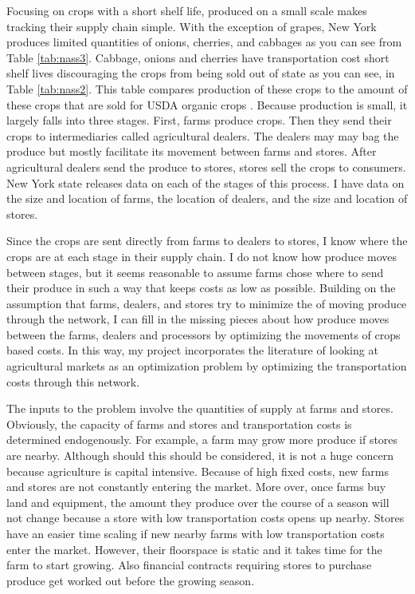 \documentclass{report}
\begin{document}
Focusing on crops with a short shelf life, produced on a small scale makes tracking their supply chain simple. With the exception of grapes, New York produces limited quantities of onions, cherries, and cabbages as you can see from Table \ref{tab:nass3}. Cabbage, onions and cherries have transportation cost short shelf lives discouraging the crops from being sold out of state as you can see, in Table \ref{tab:nass2}. This table compares production of these crops to the amount of these crops that are sold for USDA organic crops \cite{nass2}. Because production is small, it largely falls into three stages. First, farms produce crops. Then they send their crops to intermediaries called agricultural dealers. The dealers may may bag the produce but mostly facilitate its movement between farms and stores. After agricultural dealers send the produce to stores, stores sell the crops to consumers. New York state releases data on each of the stages of this process. I have data on the size and location of farms, the location of dealers, and the size and location of stores. 

Since the crops are sent directly from farms to dealers to stores, I know where the crops are at each stage in their supply chain. I do not know how produce moves between stages, but it seems reasonable to assume farms chose where to send their produce in such a way that keeps costs as low as possible. Building on the assumption that farms, dealers, and stores try to minimize the of moving produce through the network, I can fill in the missing pieces about how produce moves between the farms, dealers and processors by optimizing the movements of crops based costs. In this way, my project incorporates the literature of looking at agricultural markets as an optimization problem by optimizing the transportation costs through this network.

The inputs to the problem involve the quantities of supply at farms and stores. Obviously, the capacity of farms and stores and transportation costs is determined endogenously. For example, a farm may grow more produce if stores are nearby. Although should this should be considered, it is not a huge concern because agriculture is capital intensive. Because of high fixed costs, new farms and stores are not constantly entering the market. More over, once farms buy land and equipment, the amount they produce over the course of a season will not change because a store with low transportation costs opens up nearby. Stores have an easier time scaling if new nearby farms with low transportation costs enter the market. However, their floorspace is static and it takes time for the farm to start growing. Also financial contracts requiring stores to purchase produce get worked out before the growing season.
\end{document}
